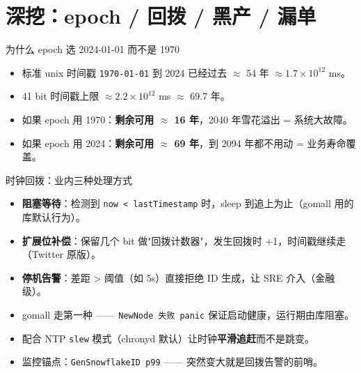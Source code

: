 \documentclass[aspectratio=169,11pt]{beamer}
\begin{document}
\section{深挖：epoch / 回拨 / 黑产 / 漏单}

\begin{frame}[shrink]{为什么 epoch 选 2024-01-01 而不是 1970}
\begin{itemize}
  \item 标准 unix 时间戳 \texttt{1970-01-01} 到 2024 已经过去 $\approx$ 54 年 $\approx 1.7 \times 10^{12}$ ms。
  \item 41 bit 时间戳上限 $\approx 2.2 \times 10^{12}$ ms $\approx$ 69.7 年。
  \item 如果 epoch 用 1970：\textbf{剩余可用 $\approx$ 16 年}，2040 年雪花溢出 = 系统大故障。
  \item 如果 epoch 用 2024：\textbf{剩余可用 $\approx$ 69 年}，到 2094 年都不用动 = 业务寿命覆盖。
\end{itemize}
\vspace{2mm}
\end{frame}

\begin{frame}[shrink]{时钟回拨：业内三种处理方式}
\begin{itemize}
  \item \textbf{阻塞等待}：检测到 \texttt{now < lastTimestamp} 时，sleep 到追上为止（gomall 用的库默认行为）。
  \item \textbf{扩展位补偿}：保留几个 bit 做"回拨计数器"，发生回拨时 +1，时间戳继续走（Twitter 原版）。
  \item \textbf{停机告警}：差距 > 阈值（如 5s）直接拒绝 ID 生成，让 SRE 介入（金融级）。
\end{itemize}
\vspace{2mm}
\begin{itemize}
  \item gomall 走第一种 —— \texttt{NewNode 失败 panic} 保证启动健康，运行期由库阻塞。
  \item 配合 NTP \texttt{slew} 模式（chronyd 默认）让时钟\textbf{平滑追赶}而不是跳变。
  \item 监控锚点：\texttt{GenSnowflakeID p99} —— 突然变大就是回拨告警的前哨。
\end{itemize}
\end{frame}
\end{document}
